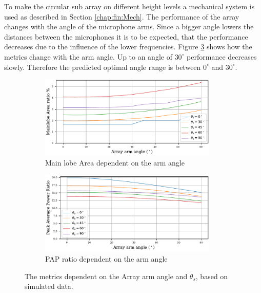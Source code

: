\newpage
To make the circular sub array on different height levels
a mechanical system is used as described in Section \ref{chap:fin:Mech}.
The performance of the array changes with the angle of the microphone arms.
Since a bigger angle lowers the distances between the microphones it is to be
expected, that the performance decreases due to the influence of the lower frequencies.
Figure \ref{fig:fintilt} shows how the metrics change with the arm angle.
Up to an angle of $30^\circ$ performance decreases slowly.
Therefore the predicted optimal angle range is between $0^\circ$ and $30^\circ$.
\begin{figure}[h!]
	\centering
	\begin{subfigure}[b]{1\textwidth}
		\centering
		\includegraphics[width=0.93\textwidth]{images/5_array_evaluation/tilt_area.pdf}
		\caption{Main lobe Area dependent on the arm angle}
		\label{fig:finartilt}
	\end{subfigure}
	\begin{subfigure}[b]{1\textwidth}
		\centering
		\includegraphics[width=0.93\textwidth]{images/5_array_evaluation/tilt_PAP.pdf}
		\caption{PAP ratio dependent on the arm angle}
		\label{fig:finpaptilt}
	\end{subfigure}
	\caption{The metrics dependent on the Array arm angle and $\theta_s$, based
		on simulated data.}
	\label{fig:fintilt}
\end{figure}
